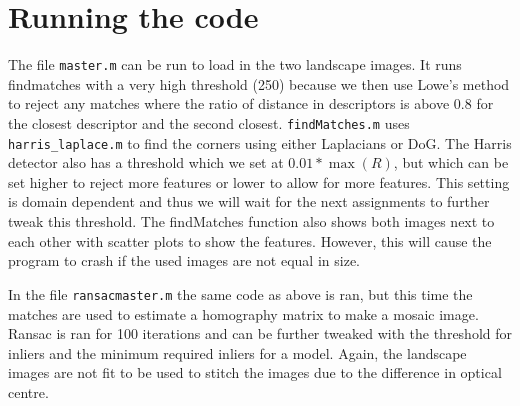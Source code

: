 \documentclass[a4paper,10pt]{article}
\begin{document}



\clearpage
\appendix
\section{Running the code}
The file \verb|master.m| can be run to load in the two landscape images. It runs findmatches with a very high threshold (250) because we then use Lowe's method to reject any matches where the ratio of distance in descriptors is above $0.8$ for the closest descriptor and the second closest. \verb|findMatches.m| uses \verb|harris_laplace.m| to find the corners using either Laplacians or DoG. The Harris detector also has a threshold which we set at $0.01*\max(R)$, but which can be set higher to reject more features or lower to allow for more features. This setting is domain dependent and thus we will wait for the next assignments to further tweak this threshold. The findMatches function also shows both images next to each other with scatter plots to show the features. However, this will cause the program to crash if the used images are not equal in size.

In the file \verb|ransacmaster.m| the same code as above is ran, but this time the matches are used to estimate a homography matrix to make a mosaic image. Ransac is ran for 100 iterations and can be further tweaked with the threshold for inliers and the minimum required inliers for a model. Again, the landscape images are not fit to be used to stitch the images due to the difference in optical centre.
\end{document}
